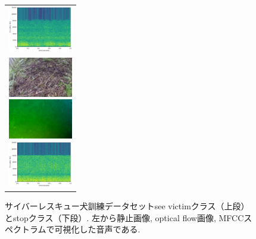 \documentclass[MIRU,submit]{miru2019j}
\begin{document}
\begin{figure}[tb]
\begin{tabular}{l}
      \begin{minipage}{0.32\hsize}
        \begin{center}
          \includegraphics[clip, width=2.8cm]{./Figures/sound_seevictim.eps}
        \end{center}
      \end{minipage}
\\  %
      \begin{minipage}{0.32\hsize}
        \begin{center}
          \includegraphics[clip, width=2.8cm]{./Figures/still_stop1-3.eps}
        \end{center}
      \end{minipage}
      \begin{minipage}{0.32\hsize}
        \begin{center}
          \includegraphics[clip, width=2.8cm]{./Figures/optic_stop1-3.eps}
        \end{center}
      \end{minipage}
      \begin{minipage}{0.32\hsize}
        \begin{center}
          \includegraphics[clip, width=2.8cm]{./Figures/sound_stop2.eps}
        \end{center}
      \end{minipage}
    \end{tabular}
    \caption{サイバーレスキュー犬訓練データセットsee victimクラス（上段）とstopクラス（下段）. 左から静止画像, optical flow画像, MFCCスペクトラムで可視化した音声である.}
    \label{dataset}
\end{figure}
\end{document}
